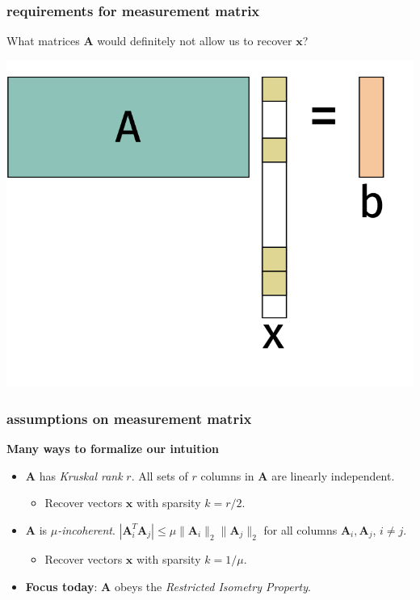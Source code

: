 \documentclass[compress]{beamer}
\newcommand{\bv}[1]{\mathbf{#1}}
\begin{document}
\begin{frame}
	\frametitle{requirements for measurement matrix}
	What matrices $\bv{A}$ would definitely not allow us to recover $\bv{x}$?
	\begin{center}
		\includegraphics[width=.5\textwidth]{sparseRegressioon.png}
	\end{center}
\end{frame}

\begin{frame}
	\frametitle{assumptions on measurement matrix}
	\textbf{Many ways to formalize our intuition}
	\begin{itemize}
		\item $\bv{A}$ has \alert{\emph{Kruskal rank}} $r$. All sets of $r$ columns in $\bv{A}$ are linearly independent.
		\begin{itemize}
			\item Recover vectors $\bv{x}$ with sparsity $k = r/2$. 
		\end{itemize}
		\item $\bv{A}$ is \alert{\emph{$\mu$-incoherent}}. $|\bv{A}_i^T\bv{A}_j| \leq \mu \|\bv{A}_i\|_2 \|\bv{A}_j\|_2$ for all columns $\bv{A}_i, \bv{A}_j$, $i\neq j$. 
		\begin{itemize}
			\item Recover vectors $\bv{x}$ with sparsity $k = 1/\mu$. 
		\end{itemize}
		\item \textbf{Focus today}: $\bv{A}$ obeys the \alert{\emph{Restricted Isometry Property}}.
	\end{itemize}
\end{frame}
\end{document}
